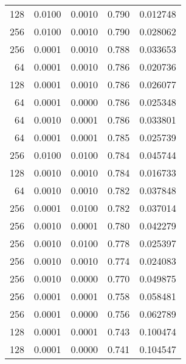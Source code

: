 \begin{tabular}{rrrrr}
 128 &  0.0100 &  0.0010 &  0.790 &  0.012748 \\
 256 &  0.0100 &  0.0010 &  0.790 &  0.028062 \\
 256 &  0.0001 &  0.0010 &  0.788 &  0.033653 \\
  64 &  0.0001 &  0.0010 &  0.786 &  0.020736 \\
 128 &  0.0001 &  0.0010 &  0.786 &  0.026077 \\
  64 &  0.0001 &  0.0000 &  0.786 &  0.025348 \\
  64 &  0.0010 &  0.0001 &  0.786 &  0.033801 \\
  64 &  0.0001 &  0.0001 &  0.785 &  0.025739 \\
 256 &  0.0100 &  0.0100 &  0.784 &  0.045744 \\
 128 &  0.0010 &  0.0010 &  0.784 &  0.016733 \\
  64 &  0.0010 &  0.0010 &  0.782 &  0.037848 \\
 256 &  0.0001 &  0.0100 &  0.782 &  0.037014 \\
 256 &  0.0010 &  0.0001 &  0.780 &  0.042279 \\
 256 &  0.0010 &  0.0100 &  0.778 &  0.025397 \\
 256 &  0.0010 &  0.0010 &  0.774 &  0.024083 \\
 256 &  0.0010 &  0.0000 &  0.770 &  0.049875 \\
 256 &  0.0001 &  0.0001 &  0.758 &  0.058481 \\
 256 &  0.0001 &  0.0000 &  0.756 &  0.062789 \\
 128 &  0.0001 &  0.0001 &  0.743 &  0.100474 \\
 128 &  0.0001 &  0.0000 &  0.741 &  0.104547 \\
\bottomrule
\end{tabular}
